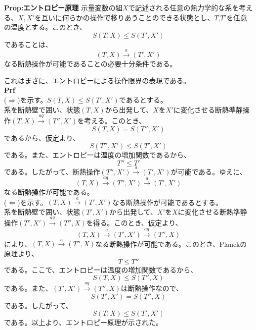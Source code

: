 \documentclass[a4paper,11pt]{jsarticle}
\begin{document}
\begin{itembox}[l]{\textbf{Prop:エントロピー原理}}
    示量変数の組$X$で記述される任意の熱力学的な系を考える、$X,X'$を互いに何らかの操作で移りあうことのできる状態とし、$T$,$T'$を任意の温度とする。このとき、
    \begin{equation}
        S(T,X) \leq S(T',X')
    \end{equation}
    であることは、
    \begin{equation}
        (T,X) \xrightarrow{a} (T',X')
    \end{equation}
    なる断熱操作が可能であることの必要十分条件である。
\end{itembox}
これはまさに、エントロピーによる操作限界の表現である。\\
\textbf{Prf}\\
($\Rightarrow$)を示す。$S(T,X) \leq S(T',X')$であるとする。\\
系を断熱壁で囲い、状態$(T,X)$から出発して、$X$を$X'$に変化させる断熱準静操作$(T,X)\xrightarrow{aq}(T'',X')$を考える。このとき、
\begin{equation}
    S(T,X) = S(T'',X')
\end{equation}
であるから、仮定より、
\begin{equation}
    S(T'',X') \leq S(T',X')
\end{equation}
である。また、エントロピーは温度の増加関数であるから、
\begin{equation}
    T'' \leq T'
\end{equation}
である。したがって、断熱操作$(T'',X')\xrightarrow{a}(T',X')$が可能である。ゆえに、
\begin{equation}
    (T,X) \xrightarrow{aq} (T'',X') \xrightarrow{a} (T',X')
\end{equation}
なる断熱操作が可能である。\\
($\Leftarrow$)を示す。$(T,X)\xrightarrow{a}(T',X')$なる断熱操作が可能であるとする。\\
系を断熱壁で囲い、状態$(T',X')$から出発して、$X'$を$X$に変化させる断熱準静操作$(T',X')\xrightarrow{aq}(T'',X)$を得る。このとき、仮定より、
\begin{equation}
    (T,X) \xrightarrow{a} (T',X') \xrightarrow{aq} (T'',X)
\end{equation}
により、$(T,X)\xrightarrow{a}(T'',X)$なる断熱操作が可能である。このとき、Planckの原理より、
\begin{equation}
    T \leq T''
\end{equation}
である。ここで、エントロピーは温度の増加関数であるから、
\begin{equation}
    S(T,X) \leq S(T'',X)
\end{equation}
である。また、$(T',X')\xrightarrow{aq}(T'',X)$は断熱操作なので、
\begin{equation}
    S(T',X') = S(T'',X)
\end{equation}
である。したがって、
\begin{equation}
    S(T,X) \leq S(T',X')
\end{equation}
である。以上より、エントロピー原理が示された。\\
\end{document}

